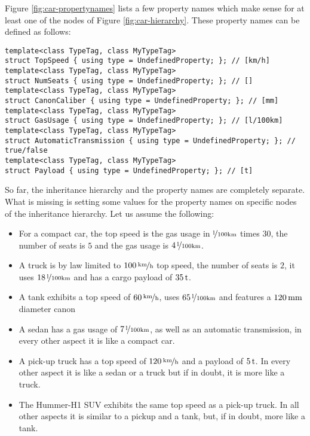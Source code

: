 Figure \ref{fig:car-propertynames} lists a few property names which
make sense for at least one of the nodes of Figure
\ref{fig:car-hierarchy}. These property names can be defined as
follows:
\begin{lstlisting}[name=propsyscars,style=DumuxCode]
template<class TypeTag, class MyTypeTag>
struct TopSpeed { using type = UndefinedProperty; }; // [km/h]
template<class TypeTag, class MyTypeTag>
struct NumSeats { using type = UndefinedProperty; }; // []
template<class TypeTag, class MyTypeTag>
struct CanonCaliber { using type = UndefinedProperty; }; // [mm]
template<class TypeTag, class MyTypeTag>
struct GasUsage { using type = UndefinedProperty; }; // [l/100km]
template<class TypeTag, class MyTypeTag>
struct AutomaticTransmission { using type = UndefinedProperty; }; // true/false
template<class TypeTag, class MyTypeTag>
struct Payload { using type = UndefinedProperty; }; // [t]
\end{lstlisting}

\noindent
So far, the inheritance hierarchy and the property names are completely
separate. What is missing is setting some values for the property
names on specific nodes of the inheritance hierarchy. Let us assume
the following:
\begin{itemize}
\item For a compact car, the top speed is the gas usage in $\unitfrac{l}{100km}$
  times $30$, the number of seats is $5$ and the gas usage is
  $\unitfrac[4]{l}{100km}$.
\item A truck is by law limited to $\unitfrac[100]{km}{h}$ top speed, the number
  of seats is $2$, it uses $\unitfrac[18]{l}{100km}$ and has a cargo payload of
  $\unit[35]{t}$.
\item A tank exhibits a top speed of $\unitfrac[60]{km}{h}$, uses $\unitfrac[65]{l}{100km}$
  and features a $\unit[120]{mm}$ diameter canon
\item A sedan has a gas usage of $\unitfrac[7]{l}{100km}$, as well as an automatic
  transmission, in every other aspect it is like a compact car.
\item A pick-up truck has a top speed of $\unitfrac[120]{km}{h}$ and a payload of
  $\unit[5]{t}$. In every other aspect it is like a sedan or a truck but if in
  doubt, it is more like a truck.
\item The Hummer-H1 SUV exhibits the same top speed as a pick-up
  truck.  In all other aspects it is similar to a pickup and a tank,
  but, if in doubt, more like a tank.
\end{itemize}

